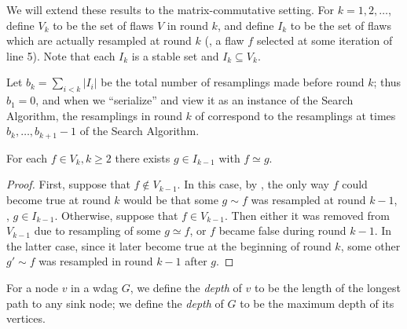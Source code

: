 \documentclass{toc}
\begin{document}
 We  will extend these results to the matrix-commutative setting. For $k = 1, 2, \dots$, define $V_k$ to be the set of flaws $V$ in round $k$, and define $I_k$ to be the set of flaws which are actually resampled at round $k$ (\ie, a flaw $f$ selected at some iteration of line 5). Note that each $I_k$ is a stable set and $I_k \subseteq V_k$. 
 
  Let $b_k = \sum_{i < k} |I_i|$ be the total number of resamplings made before round $k$; thus $b_1 = 0$, and when we ``serialize''  and view it as an instance of the Search Algorithm, the resamplings in round $k$ of  correspond to the resamplings at times $b_{k}, \dots, b_{k+1} - 1$ of the Search Algorithm.
\begin{proposition}
\label{gaha0}
 For each $f \in V_k, k \geq 2$ there exists $g \in I_{k-1}$ with $f \simeq g$.
\end{proposition}
\begin{proof}
First, suppose that $f \notin V_{k-1}$. In this case, by , the only way $f$ could become true at round $k$ would be that some $g \sim f$ was resampled at round $k-1$, \ie, $g \in I_{k-1}$. Otherwise, suppose that $f \in V_{k-1}$. Then either it was removed from $V_{k-1}$ due to resampling of some $g \simeq f$, or $f$ became false during round $k-1$.  In the latter case, since it later become true at the beginning of round $k$, some other $g'  \sim f$ was resampled in round $k-1$ after $g$.
\end{proof}

For a node $v$ in a wdag $G$, we define the \emph{depth} of $v$ to be the length of the longest path to any sink node; we define the \emph{depth} of $G$ to be the maximum depth of its vertices.
\end{document}
